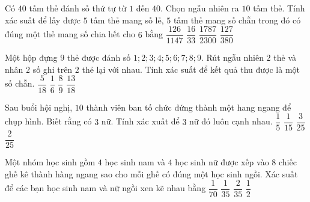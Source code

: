 \begin{ex}%
Có $40$ tấm thẻ đánh số thứ tự từ $1$ đến $40$. Chọn ngẫu nhiên ra $10$ tấm thẻ. Tính xác suất để lấy được $5$ tấm thẻ mang số lẻ, $5$ tấm thẻ mang số chẵn trong đó có đúng một thẻ mang số chia hết cho $6$ bằng
\choice
{\True $\dfrac{126}{1147}$}
{$\dfrac{16}{33}$}
{$\dfrac{1787}{2300}$}
{$\dfrac{127}{380}$}
\end{ex}

\begin{ex}%
Một hộp đựng $9$ thẻ được đánh số $1; 2; 3; 4; 5; 6; 7; 8; 9$. Rút ngẫu nhiên $2$ thẻ và nhân $2$ số ghi trên $2$ thẻ lại với nhau. Tính xác suất để kết quả thu được là một số chẵn.
\choice
{$\dfrac{5}{18}$}
{$\dfrac{1}{6}$}
{$\dfrac{8}{9}$}
{\True $\dfrac{13}{18}$}
\end{ex}

\begin{ex}%
Sau buổi hội nghị, $10$ thành viên ban tố chức đứng thành một hang ngang để chụp hình. Biết rằng có $3$ nữ. Tính xác xuất để $3$ nữ đó luôn cạnh nhau.
\choice
{$\dfrac{1}{5}$}
{\True $\dfrac{1}{15}$}
{$\dfrac{3}{25}$}
{$\dfrac{2}{25}$}
\end{ex}

\begin{ex}%
Một nhóm học sinh gồm $4$ học sinh nam và $4$ học sinh nữ được xếp vào $8$ chiếc ghế kê thành hàng ngang sao cho mỗi ghế có đúng một học sinh ngồi. Xác suất để các bạn học sinh nam và nữ ngồi xen kẽ nhau bằng
\choice
{$\dfrac{1}{70}$}
{\True $\dfrac{1}{35}$}
{$\dfrac{2}{35}$}
{$\dfrac{1}{2}$}
\end{ex}

